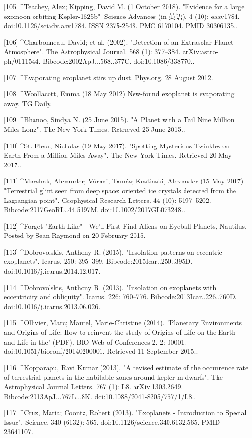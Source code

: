 [105]
^Teachey, Alex; Kipping, David M. (1 October 2018). "Evidence for a large exomoon orbiting Kepler-1625b". Science Advances (in 英语). 4 (10): eaav1784. doi:10.1126/sciadv.aav1784. ISSN 2375-2548. PMC 6170104. PMID 30306135..

[106]
^Charbonneau, David; et al. (2002). "Detection of an Extrasolar Planet Atmosphere". The Astrophysical Journal. 568 (1): 377–384. arXiv:astro-ph/0111544. Bibcode:2002ApJ...568..377C. doi:10.1086/338770..

[107]
^Evaporating exoplanet stirs up dust. Phys.org. 28 August 2012.

[108]
^Woollacott, Emma (18 May 2012) New-found exoplanet is evaporating away. TG Daily.

[109]
^Bhanoo, Sindya N. (25 June 2015). "A Planet with a Tail Nine Million Miles Long". The New York Times. Retrieved 25 June 2015..

[110]
^St. Fleur, Nicholas (19 May 2017). "Spotting Mysterious Twinkles on Earth From a Million Miles Away". The New York Times. Retrieved 20 May 2017..

[111]
^Marshak, Alexander; Várnai, Tamás; Kostinski, Alexander (15 May 2017). "Terrestrial glint seen from deep space: oriented ice crystals detected from the Lagrangian point". Geophysical Research Letters. 44 (10): 5197–5202. Bibcode:2017GeoRL..44.5197M. doi:10.1002/2017GL073248..

[112]
^Forget "Earth-Like"—We'll First Find Aliens on Eyeball Planets, Nautilus, Posted by Sean Raymond on 20 February 2015.

[113]
^Dobrovolskis, Anthony R. (2015). "Insolation patterns on eccentric exoplanets". Icarus. 250: 395–399. Bibcode:2015Icar..250..395D. doi:10.1016/j.icarus.2014.12.017..

[114]
^Dobrovolskis, Anthony R. (2013). "Insolation on exoplanets with eccentricity and obliquity". Icarus. 226: 760–776. Bibcode:2013Icar..226..760D. doi:10.1016/j.icarus.2013.06.026..

[115]
^Ollivier, Marc; Maurel, Marie-Christine (2014). "Planetary Environments and Origins of Life: How to reinvent the study of Origins of Life on the Earth and Life in the" (PDF). BIO Web of Conferences 2. 2: 00001. doi:10.1051/bioconf/20140200001. Retrieved 11 September 2015..

[116]
^Kopparapu, Ravi Kumar (2013). "A revised estimate of the occurrence rate of terrestrial planets in the habitable zones around kepler m-dwarfs". The Astrophysical Journal Letters. 767 (1): L8. arXiv:1303.2649. Bibcode:2013ApJ...767L...8K. doi:10.1088/2041-8205/767/1/L8..

[117]
^Cruz, Maria; Coontz, Robert (2013). "Exoplanets - Introduction to Special Issue". Science. 340 (6132): 565. doi:10.1126/science.340.6132.565. PMID 23641107..